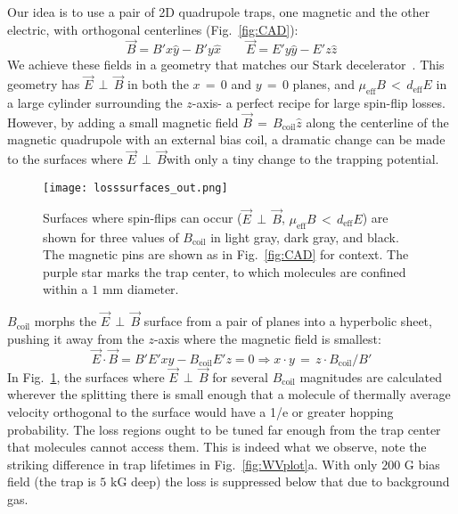 \documentclass[%
 reprint,
 amsmath,amssymb,
 aps,
prl,
]{revtex4-1}
\newcommand{\bcl}{{$B_\text{coil}$}}
\newcommand{\epb}{{$\vec{E}\,{\perp}\,\vec{B}$}}
\begin{document}
Our idea is to use a pair of 2D quadrupole traps, one magnetic and the other electric, with orthogonal centerlines (Fig.~\ref{fig:CAD}):
\begin{equation}
\vec{B}=B'x\hat{y}-B'y\hat{x}\quad\quad\vec{E}=E'y\hat{y}-E'z\hat{z}
\end{equation}
We achieve these fields in a geometry that matches our Stark decelerator~\cite{Bochinski2003}. 
This geometry has \epb{} in both the $x\,{=}\,0$ and $y\,{=}\,0$ planes, and $\mu_\text{eff}B \,{<}\, d_\text{eff}E$ in a large cylinder surrounding the $z$-axis- a perfect recipe for large spin-flip losses.
However, by adding a small magnetic field $\vec{B}\,{=}\,B_\text{coil}\hat{z}$ along the centerline of the magnetic quadrupole with an external bias coil, a dramatic change can be made to the surfaces where \epb with only a tiny change to the trapping potential.


\begin{figure}[tb]
\texttt{[image: losssurfaces\_out.png]}%
\caption{
Surfaces where spin-flips can occur (\epb{}, $\mu_\text{eff}B\,{<}\,d_\text{eff}E$) are shown for three values of \bcl{} in light gray, dark gray, and black. 
The magnetic pins are shown as in Fig.~\ref{fig:CAD} for context. 
The purple star marks the trap center, to which molecules are confined within a \raisebox{2.5px}{\texttildelow} $\!\!1\text{ mm}$ diameter.
\label{fig:LSurfs}}
\end{figure}

\bcl{} morphs the \epb{} surface from a pair of planes into a hyperbolic sheet, pushing it away from the $z$-axis where the magnetic field is smallest:
\begin{equation}
\vec{E}\cdot\vec{B}=B'E'xy - B_\text{coil}E'z=0\Rightarrow x\cdot y\,{=}\, z\cdot B_\text{coil}/B'
\end{equation}
In Fig.~\ref{fig:LSurfs}, the surfaces where \epb{} for several \bcl{} magnitudes are calculated wherever the splitting there is small enough that a molecule of thermally average velocity orthogonal to the surface would have a 1/e or greater hopping probability.
The loss regions ought to be tuned far enough from the trap center that molecules cannot access them.
This is indeed what we observe, note the striking difference in trap lifetimes in Fig.~\ref{fig:WVplot}a.
With only $200\text{ G}$ bias field (the trap is $5\text{ kG}$ deep) the loss is suppressed below that due to background gas.
\end{document}
